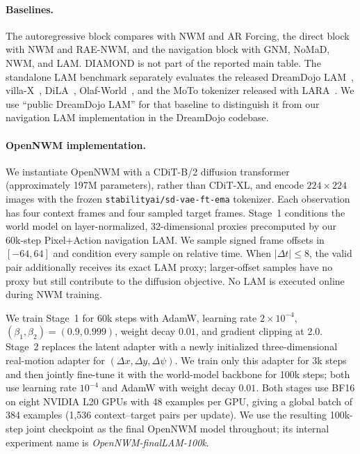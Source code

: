 \paragraph{Baselines.}
The autoregressive block compares with NWM and AR Forcing, the direct block
with NWM and RAE-NWM, and the navigation block with GNM, NoMaD, NWM, and LAM.
DIAMOND is not part of the reported main table.  The standalone LAM benchmark
separately evaluates the released DreamDojo LAM~\citep{gao2026dreamdojo},
villa-X~\citep{chen2025villa0x0}, DiLA~\citep{zhang2026dila},
Olaf-World~\citep{jiang2026olaf}, and the MoTo tokenizer released with
LARA~\citep{liu2026lara,chen2024moto}.  We use ``public DreamDojo LAM'' for
that baseline to distinguish it from our navigation LAM implementation in the
DreamDojo codebase.

\paragraph{OpenNWM implementation.}
We instantiate OpenNWM with a CDiT-B/2 diffusion transformer (approximately
197M parameters), rather than CDiT-XL, and encode $224\times224$ images with
the frozen \texttt{stabilityai/sd-vae-ft-ema} tokenizer.  Each observation has
four context frames and four sampled target frames.  Stage~1 conditions the
world model on layer-normalized, 32-dimensional proxies precomputed by our
60k-step Pixel+Action navigation LAM.  We sample signed frame offsets in
$[-64,64]$ and condition every sample on relative time.  When
$|\Delta t|\leq 8$, the valid pair additionally receives its exact LAM proxy;
larger-offset samples have no proxy but still contribute to the diffusion
objective.  No LAM is executed online during NWM training.

We train Stage~1 for 60k steps with AdamW, learning rate
$2\times10^{-4}$, $(\beta_1,\beta_2)=(0.9,0.999)$, weight decay $0.01$, and
gradient clipping at 2.0.  Stage~2 replaces the latent adapter with a newly
initialized three-dimensional real-motion adapter for
$(\Delta x,\Delta y,\Delta\psi)$.
We train only this adapter for 3k steps and then jointly fine-tune it with the
world-model backbone for 100k steps; both use learning rate $10^{-4}$ and
AdamW with weight decay $0.01$.  Both stages use BF16 on eight NVIDIA L20 GPUs
with 48 examples per GPU, giving a global batch of 384 examples (1,536
context--target pairs per update).  We use the resulting 100k-step joint
checkpoint as the final OpenNWM model throughout; its internal experiment name
is \emph{OpenNWM-finalLAM-100k}.

